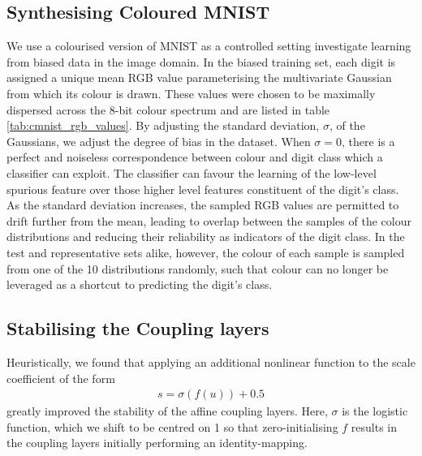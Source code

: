 \subsection{Synthesising Coloured MNIST}\label{sec:color-details}
\noindent We use a colourised version of MNIST as a controlled setting investigate learning from biased data in the image domain. In the biased training set, each digit is assigned a unique mean RGB value parameterising the multivariate Gaussian from which its colour is drawn. These values were chosen to be maximally dispersed across the 8-bit colour spectrum and are listed in table \ref{tab:cmnist_rgb_values}. By adjusting the standard deviation, $\sigma$, of the Gaussians, we adjust the degree of bias in the dataset. When $\sigma=0$, there is a perfect and noiseless correspondence between colour and digit class which a classifier can exploit. The classifier can favour the learning of the low-level spurious feature over those higher level features constituent of the digit's class. As the standard deviation increases, the sampled RGB values are permitted to drift further from the mean, leading to overlap between the samples of the colour distributions and reducing their reliability as indicators of the digit class. In the test and representative sets alike, however, the colour of each sample is sampled from one of the 10 distributions randomly, such that colour can no longer be leveraged as a shortcut to predicting the digit's class.

\subsection{Stabilising the Coupling layers}\label{sec:those-darn-coupling-layers}
\noindent Heuristically, we found that  applying an additional nonlinear function to the scale coefficient of the form
\begin{align}
  s = \sigma (f(u)) + 0.5
  \label{eq:heuristic-1}
\end{align}
greatly improved the stability of the affine coupling layers. Here, $\sigma$ is the logistic function, which we shift to be centred on 1 so that zero-initialising $f$ results in the coupling layers initially performing an identity-mapping.

